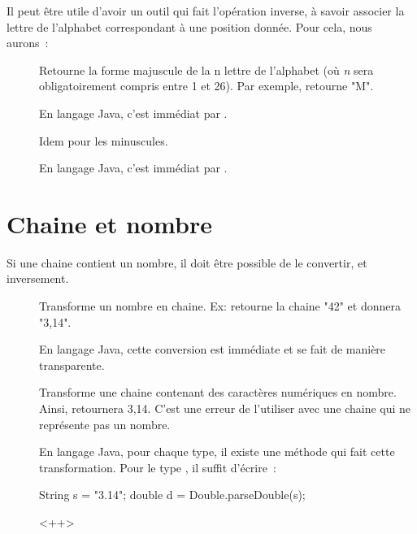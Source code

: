 	Il peut être utile d’avoir un outil qui fait l’opération inverse, 
	à savoir associer la lettre de l’alphabet correspondant à une position donnée. 
	Pour cela, nous aurons~: 

	\begin{description}

		\item[]
		Retourne la forme majuscule de la n\ieme{} lettre de l’alphabet 
		(où \textit{n} sera obligatoirement compris entre 1 et 26). 
		Par exemple,  retourne "M".

		En langage Java, c'est immédiat par .

	\item[]
		Idem pour les minuscules.
		
		En langage Java, c'est immédiat par .

	\end{description}

	
\section{Chaine et nombre}

	Si une chaine contient un nombre, il doit être possible de le convertir, et
	inversement.

	\begin{description}
	
		\item[]
		Transforme un nombre en chaine.
		Ex:  retourne la chaine "42"
		et  donnera "3,14". 

		En langage Java, cette conversion est immédiate et se fait de 
		manière transparente.

		\item[]
		Transforme une chaine contenant des caractères numériques 
		en nombre.
		Ainsi,  retournera 3,14. 
		C’est une erreur de l’utiliser avec une chaine
		qui ne représente pas un nombre.
	
		En langage Java, pour chaque type, il existe une méthode qui fait cette
		transformation. Pour le type , il suffit d'écrire~:

		\begin{java}
String s = "3.14";		
double d = Double.parseDouble(s);			
		\end{java}<++>

	\end{description}
	
